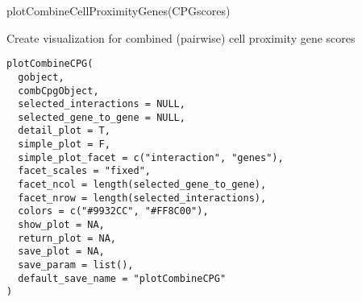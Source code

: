 \documentclass[a4paper]{book}
\begin{document}
%
\begin{Examples}
\begin{ExampleCode}
    plotCombineCellProximityGenes(CPGscores)
\end{ExampleCode}
\end{Examples}
%
\begin{Description}\relax
Create visualization for combined (pairwise) cell proximity gene scores
\end{Description}
%
\begin{Usage}
\begin{verbatim}
plotCombineCPG(
  gobject,
  combCpgObject,
  selected_interactions = NULL,
  selected_gene_to_gene = NULL,
  detail_plot = T,
  simple_plot = F,
  simple_plot_facet = c("interaction", "genes"),
  facet_scales = "fixed",
  facet_ncol = length(selected_gene_to_gene),
  facet_nrow = length(selected_interactions),
  colors = c("#9932CC", "#FF8C00"),
  show_plot = NA,
  return_plot = NA,
  save_plot = NA,
  save_param = list(),
  default_save_name = "plotCombineCPG"
)
\end{verbatim}
\end{Usage}
%
\end{document}
